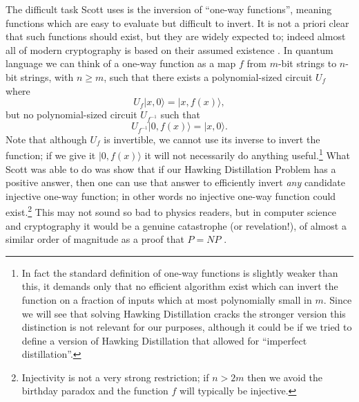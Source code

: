 \documentclass[12pt]{article}
\newcommand{\be}{\begin{equation}}
\newcommand{\ee}{\end{equation}}
\newcommand{\ran}{\rangle}
\begin{document}
The difficult task Scott uses is the inversion of ``one-way functions'', meaning functions which are easy to evaluate but difficult to invert.  It is not a priori clear that such functions should exist, but they are widely expected to; indeed almost all of modern cryptography is based on their assumed existence \cite{arora2009computational}.  In quantum language we can think of a one-way function as a map $f$ from $m$-bit strings to $n$-bit strings, with $n\geq  m$, such that there exists a polynomial-sized circuit $U_{f}$ where
\be\label{Uf}
U_f|x,0\ran=|x,f(x)\ran,
\ee
but no polynomial-sized circuit $U_{f^{-1}}$ such that
\be\label{Ufinv}
U_{f^{-1}}|0,f(x)\ran=|x,0\ran.
\ee
Note that although $U_f$ is invertible, we cannot use its inverse to invert the function; if we give it $|0,f(x)\ran$ it will not necessarily do anything useful.\footnote{In fact the standard definition of one-way functions is slightly weaker than this, it demands only that no efficient algorithm exist which can invert the function on a fraction of inputs which at most polynomially small in $m$.  Since we will see that solving Hawking Distillation cracks the stronger version this distinction is not relevant for our purposes, although it could be if we tried to define a version of Hawking Distillation that allowed for ``imperfect distillation''.}  What Scott was able to do was show that if our Hawking Distillation Problem has a positive answer, then one can use that answer to efficiently invert \textit{any} candidate injective one-way function; in other words no injective one-way function could exist.\footnote{Injectivity is not a very strong restriction; if $n>2m$ then we avoid the birthday paradox and the function $f$ will typically be injective.}  This may not sound so bad to physics readers, but in computer science and cryptography it would be a genuine catastrophe (or revelation!), of almost a similar order of magnitude as a proof that $P=NP$ \cite{impagliazzo1995personal}.  
\end{document}
